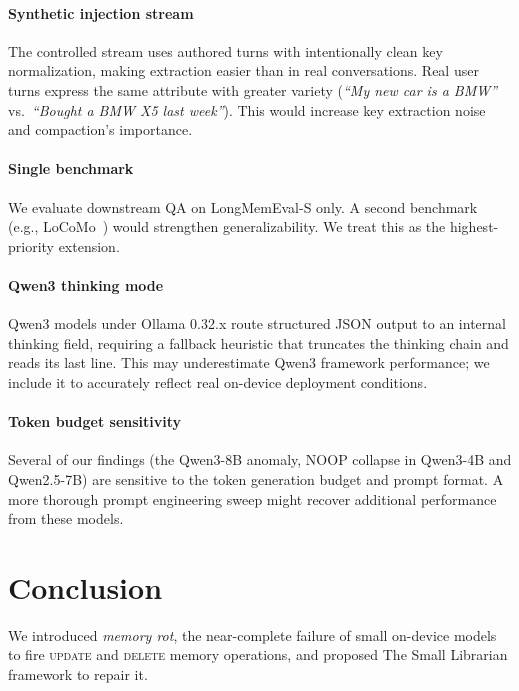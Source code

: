 \documentclass[10pt, twocolumn]{article}
\begin{document}
\paragraph{Synthetic injection stream}
The controlled stream uses authored turns with intentionally clean key
normalization, making extraction easier than in real conversations.
Real user turns express the same attribute with greater variety
(\emph{``My new car is a BMW''} vs.\ \emph{``Bought a BMW X5 last week''}).
This would increase key extraction noise and compaction's importance.

\paragraph{Single benchmark}
We evaluate downstream QA on LongMemEval-S only.
A second benchmark (e.g., LoCoMo~\cite{maharana2024evaluating}) would
strengthen generalizability.
We treat this as the highest-priority extension.

\paragraph{Qwen3 thinking mode}
Qwen3 models under Ollama 0.32.x route structured JSON output to an
internal thinking field, requiring a fallback heuristic that truncates
the thinking chain and reads its last line.
This may underestimate Qwen3 framework performance; we include it to
accurately reflect real on-device deployment conditions.

\paragraph{Token budget sensitivity}
Several of our findings (the Qwen3-8B anomaly, NOOP collapse in Qwen3-4B
and Qwen2.5-7B) are sensitive to the token generation budget and prompt
format.
A more thorough prompt engineering sweep might recover additional performance
from these models.

\section{Conclusion}
\label{sec:conclusion}

We introduced \emph{memory rot}, the near-complete failure of small
on-device models to fire \textsc{update} and \textsc{delete} memory
operations, and proposed The Small Librarian framework to repair it.
\end{document}
